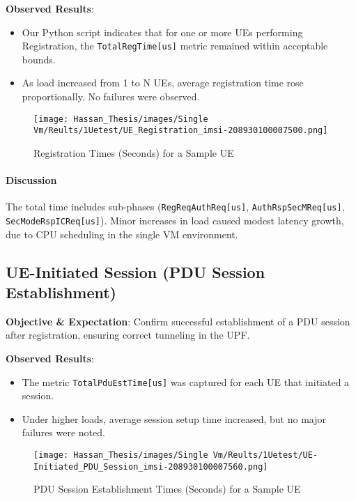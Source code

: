 \noindent \textbf{Observed Results}: 
\label{sec:results-discussion}
\begin{itemize}
    \item Our Python script indicates that for one or more UEs performing Registration, the \texttt{TotalRegTime[us]} metric remained within acceptable bounds.
    \item As load increased from 1 to N UEs, average registration time rose proportionally. No failures were observed.
\end{itemize}

\begin{figure}[H]
\centering
\caption{Registration Times (Seconds) for a Sample UE}
\label{fig:reg-times-sample-ue}
\texttt{[image: Hassan\_Thesis/images/Single Vm/Reults/1Uetest/UE\_Registration\_imsi-208930100007500.png]}
\end{figure}

\paragraph{Discussion}\raggedright
The total time includes sub-phases (\texttt{RegReqAuthReq[us]}, \texttt{AuthRspSecMReq[us]}, \texttt{SecModeRspICReq[us]}). Minor increases in load caused modest latency growth, due to CPU scheduling in the single VM environment.

\subsection{UE-Initiated Session (PDU Session Establishment)}
\textbf{Objective \& Expectation}: Confirm successful establishment of a PDU session after registration, ensuring correct tunneling in the UPF.

\noindent \textbf{Observed Results}:
\begin{itemize}
    \item The metric \texttt{TotalPduEstTime[us]} was captured for each UE that initiated a session.
    \item Under higher loads, average session setup time increased, but no major failures were noted.
\end{itemize}

\begin{figure}[H]
\centering
\caption{PDU Session Establishment Times (Seconds) for a Sample UE}
\label{fig:pdu-sess-times-sample-ue}
\texttt{[image: Hassan\_Thesis/images/Single Vm/Reults/1Uetest/UE-Initiated\_PDU\_Session\_imsi-208930100007560.png]}
\end{figure}

